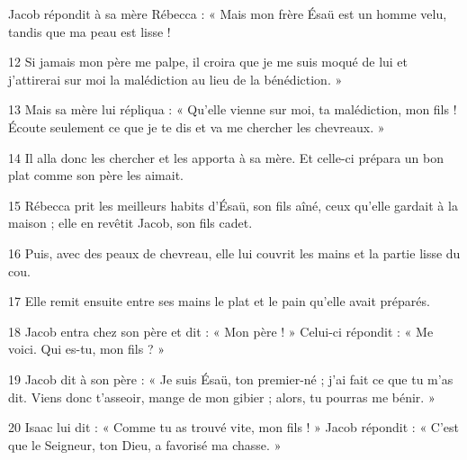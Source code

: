 Jacob répondit à sa mère Rébecca : « Mais mon frère Ésaü est un homme velu, tandis que ma peau est lisse !

12 Si jamais mon père me palpe, il croira que je me suis moqué de lui et j’attirerai sur moi la malédiction au lieu de la bénédiction. »

13 Mais sa mère lui répliqua : « Qu’elle vienne sur moi, ta malédiction, mon fils ! Écoute seulement ce que je te dis et va me chercher les chevreaux. »

14 Il alla donc les chercher et les apporta à sa mère. Et celle-ci prépara un bon plat comme son père les aimait.

15 Rébecca prit les meilleurs habits d’Ésaü, son fils aîné, ceux qu’elle gardait à la maison ; elle en revêtit Jacob, son fils cadet.

16 Puis, avec des peaux de chevreau, elle lui couvrit les mains et la partie lisse du cou.

17 Elle remit ensuite entre ses mains le plat et le pain qu’elle avait préparés.

18 Jacob entra chez son père et dit : « Mon père ! » Celui-ci répondit : « Me voici. Qui es-tu, mon fils ? »

19 Jacob dit à son père : « Je suis Ésaü, ton premier-né ; j’ai fait ce que tu m’as dit. Viens donc t’asseoir, mange de mon gibier ; alors, tu pourras me bénir. »

20 Isaac lui dit : « Comme tu as trouvé vite, mon fils ! » Jacob répondit : « C’est que le Seigneur, ton Dieu, a favorisé ma chasse. »